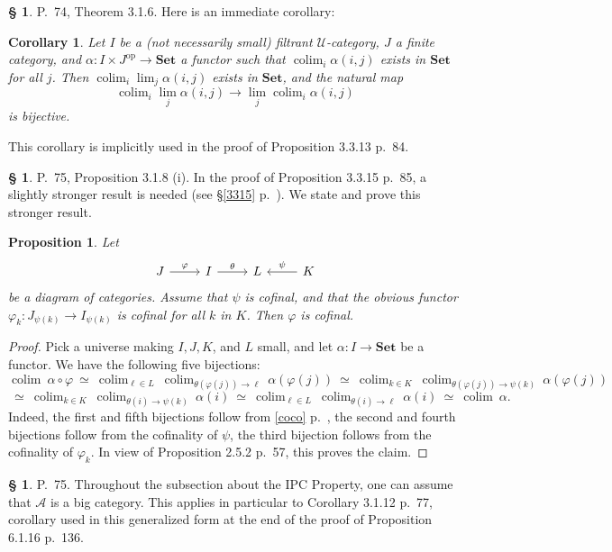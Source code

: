 \documentclass[12pt]{article}
\newtheorem{prop}[thm]{Proposition}
\newtheorem{cor}[thm]{Corollary}
\theoremstyle{remark}
\theoremstyle{definition}
\newtheorem{s}[thm]{\S}
\newcommand{\A}{\mathcal A}
\newcommand{\U}{\mathcal U}
\newcommand{\Set}{\mathbf{Set}}
\DeclareMathOperator*{\coli}{colim}
\DeclareMathOperator{\op}{op}
\begin{document}
%
%
\begin{s} 
P.~74, Theorem 3.1.6. Here is an immediate corollary: 
%
\begin{cor}\label{316}
Let $I$ be a (not necessarily small) filtrant $\U$-category, $J$ a finite category, and $\alpha:I\times J^{\op}\to\Set$ a functor such that $\coli_i\alpha(i,j)$ exists in $\Set$ for all $j$. Then $\coli_i\lim_j\alpha(i,j)$ exists in $\Set$, and the natural map 
$$
\coli_i\lim_j\alpha(i,j)\to
\lim_j\coli_i\alpha(i,j)
$$ 
is bijective. 
\end{cor}
%
This corollary is implicitly used in the proof of Proposition 3.3.13 p.~84.
\end{s}
%
%
\begin{s} 
P.~75, Proposition 3.1.8 (i). In the proof of Proposition 3.3.15 p.~85, a slightly stronger result is needed (see \S\ref{3315} p.~\pageref{3315}). We state and prove this stronger result. 
%
\begin{prop}\label{318i} 
%
Let 
$$
\begin{tikzcd}
J\ar{r}{\varphi}&I\ar{r}{\theta}&L&K\ar{l}[swap]{\psi}
\end{tikzcd}
$$
be a diagram of categories. Assume that $\psi$ is cofinal, and that the obvious functor $\varphi_k:J_{\psi(k)}\to I_{\psi(k)}$ is cofinal for all $k$ in $K$. Then $\varphi$ is cofinal. 
%
\end{prop} 
%
\begin{proof}
Pick a universe making $I,J,K$, and $L$ small, and let $\alpha:I\to\Set$ be a functor. We have the following five bijections:
$$
\coli\ \alpha\circ\varphi\ \simeq\ 
%
\coli_{\ell\in L}\ \coli_{\theta(\varphi(j))\to\ell}\ \alpha(\varphi(j))\ \simeq\ 
%
\coli_{k\in K}\ \coli_{\theta(\varphi(j))\to\psi(k)}\ \alpha(\varphi(j))
$$
$$
\ \simeq\ \coli_{k\in K}\ \coli_{\theta(i)\to\psi(k)}\ \alpha(i)\ \simeq\ 
%
\coli_{\ell\in L}\ \coli_{\theta(i)\to\ell}\ \alpha(i)\ \simeq\ 
%
\coli\ \alpha.
$$
Indeed, the first and fifth bijections follow from \eqref{coco} p.~\pageref{coco}, the second and fourth bijections follow from the cofinality of $\psi$, the third bijection follows from the cofinality of $\varphi_k$. In view of Proposition 2.5.2 p.~57, this proves the claim.
\end{proof}
\end{s}
%
%
\begin{s}\label{cipc}
P.~75. Throughout the subsection about the IPC Property, one can assume that $\A$ is a big category. This applies in particular to Corollary 3.1.12 p.~77, corollary used in this generalized form at the end of the proof of Proposition 6.1.16 p.~136.
\end{s}
\end{document}
